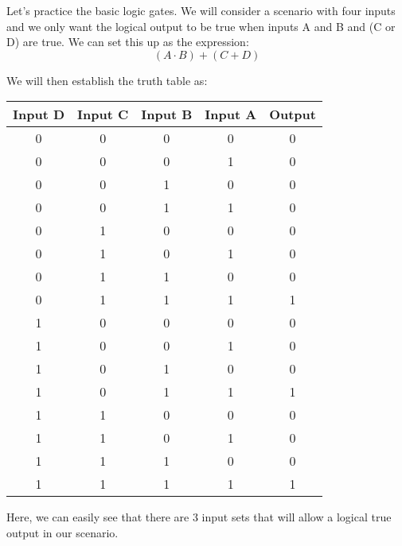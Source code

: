 
    \begin{example} \label{ex:basic-logic-gates-1}
        Let's practice the basic logic gates.
        We will consider a scenario with four inputs and we only want the logical output to be true when inputs A and B and (C or D) are true.
        We can set this up as the expression:
        \begin{equation*}
            (A \cdot B) + (C + D)
        \end{equation*}

        We will then establish the truth table as:
        \begin{center}
            \begin{tabular}{c c c c | c}
                \toprule
                Input D & Input C & Input B & Input A & Output \\
                \midrule
                    0    &    0     &    0     &    0     &    0    \\
                    0    &    0     &    0     &    1     &    0    \\
                    0    &    0     &    1     &    0     &    0    \\
                    0    &    0     &    1     &    1     &    0    \\
                    0    &    1     &    0     &    0     &    0    \\
                    0    &    1     &    0     &    1     &    0    \\
                    0    &    1     &    1     &    0     &    0    \\
                    0    &    1     &    1     &    1     &    1    \\
                    1    &    0     &    0     &    0     &    0    \\
                    1    &    0     &    0     &    1     &    0    \\
                    1    &    0     &    1     &    0     &    0    \\
                    1    &    0     &    1     &    1     &    1    \\
                    1    &    1     &    0     &    0     &    0    \\
                    1    &    1     &    0     &    1     &    0    \\
                    1    &    1     &    1     &    0     &    0    \\
                    1    &    1     &    1     &    1     &    1    \\
                \bottomrule
            \end{tabular}
        \end{center}
        Here, we can easily see that there are 3 input sets that will allow a logical true output in our scenario.


\end{example}
